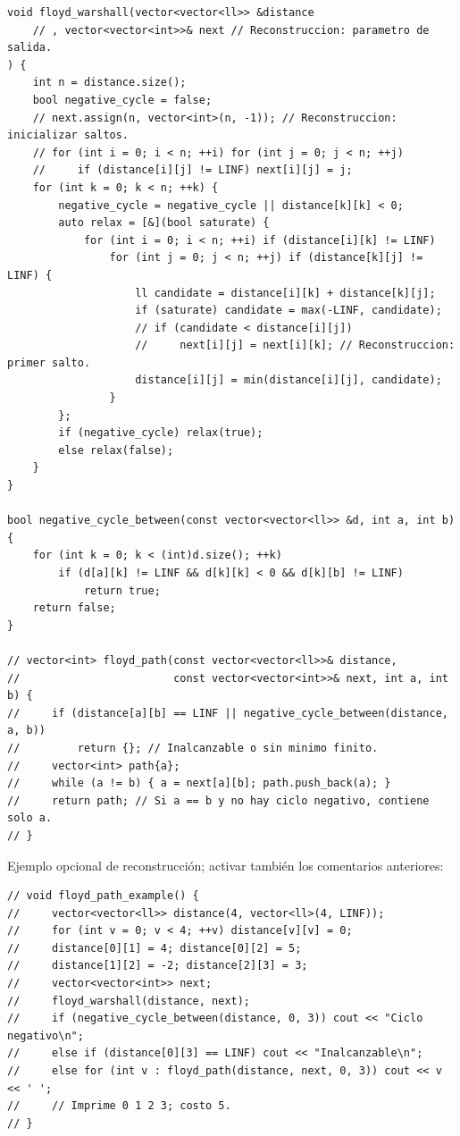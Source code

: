 \begin{lstlisting}[style=cpp]
void floyd_warshall(vector<vector<ll>> &distance
    // , vector<vector<int>>& next // Reconstruccion: parametro de salida.
) {
    int n = distance.size();
    bool negative_cycle = false;
    // next.assign(n, vector<int>(n, -1)); // Reconstruccion: inicializar saltos.
    // for (int i = 0; i < n; ++i) for (int j = 0; j < n; ++j)
    //     if (distance[i][j] != LINF) next[i][j] = j;
    for (int k = 0; k < n; ++k) {
        negative_cycle = negative_cycle || distance[k][k] < 0;
        auto relax = [&](bool saturate) {
            for (int i = 0; i < n; ++i) if (distance[i][k] != LINF)
                for (int j = 0; j < n; ++j) if (distance[k][j] != LINF) {
                    ll candidate = distance[i][k] + distance[k][j];
                    if (saturate) candidate = max(-LINF, candidate);
                    // if (candidate < distance[i][j])
                    //     next[i][j] = next[i][k]; // Reconstruccion: primer salto.
                    distance[i][j] = min(distance[i][j], candidate);
                }
        };
        if (negative_cycle) relax(true);
        else relax(false);
    }
}

bool negative_cycle_between(const vector<vector<ll>> &d, int a, int b) {
    for (int k = 0; k < (int)d.size(); ++k)
        if (d[a][k] != LINF && d[k][k] < 0 && d[k][b] != LINF)
            return true;
    return false;
}

// vector<int> floyd_path(const vector<vector<ll>>& distance,
//                        const vector<vector<int>>& next, int a, int b) {
//     if (distance[a][b] == LINF || negative_cycle_between(distance, a, b))
//         return {}; // Inalcanzable o sin minimo finito.
//     vector<int> path{a};
//     while (a != b) { a = next[a][b]; path.push_back(a); }
//     return path; // Si a == b y no hay ciclo negativo, contiene solo a.
// }
\end{lstlisting}


Ejemplo opcional de reconstrucci\'on; activar tambi\'en los comentarios anteriores:

\begin{lstlisting}[style=cpp]
// void floyd_path_example() {
//     vector<vector<ll>> distance(4, vector<ll>(4, LINF));
//     for (int v = 0; v < 4; ++v) distance[v][v] = 0;
//     distance[0][1] = 4; distance[0][2] = 5;
//     distance[1][2] = -2; distance[2][3] = 3;
//     vector<vector<int>> next;
//     floyd_warshall(distance, next);
//     if (negative_cycle_between(distance, 0, 3)) cout << "Ciclo negativo\n";
//     else if (distance[0][3] == LINF) cout << "Inalcanzable\n";
//     else for (int v : floyd_path(distance, next, 0, 3)) cout << v << ' ';
//     // Imprime 0 1 2 3; costo 5.
// }
\end{lstlisting}
